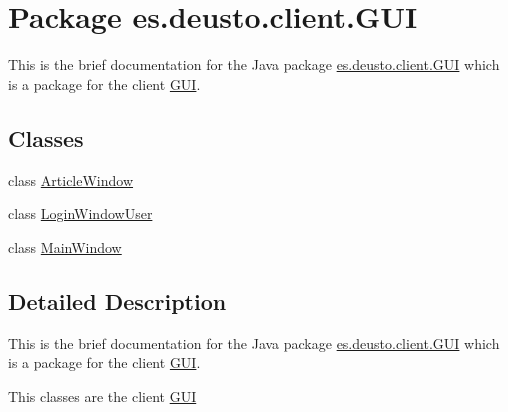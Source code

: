 \hypertarget{namespacees_1_1deusto_1_1client_1_1_g_u_i}{}\section{Package es.\+deusto.\+client.\+G\+UI}
\label{namespacees_1_1deusto_1_1client_1_1_g_u_i}


This is the brief documentation for the Java package \hyperlink{namespacees_1_1deusto_1_1client_1_1_g_u_i}{es.\+deusto.\+client.\+G\+UI} which is a package for the client \hyperlink{namespacees_1_1deusto_1_1client_1_1_g_u_i}{G\+UI}.  


\subsection*{Classes}
\begin{DoxyCompactItemize}
\item 
class \hyperlink{classes_1_1deusto_1_1client_1_1_g_u_i_1_1_article_window}{Article\+Window}
\item 
class \hyperlink{classes_1_1deusto_1_1client_1_1_g_u_i_1_1_login_window_user}{Login\+Window\+User}
\item 
class \hyperlink{classes_1_1deusto_1_1client_1_1_g_u_i_1_1_main_window}{Main\+Window}
\end{DoxyCompactItemize}


\subsection{Detailed Description}
This is the brief documentation for the Java package \hyperlink{namespacees_1_1deusto_1_1client_1_1_g_u_i}{es.\+deusto.\+client.\+G\+UI} which is a package for the client \hyperlink{namespacees_1_1deusto_1_1client_1_1_g_u_i}{G\+UI}. 

This classes are the client \hyperlink{namespacees_1_1deusto_1_1client_1_1_g_u_i}{G\+UI} 